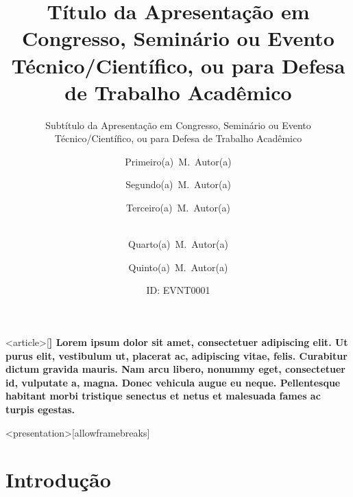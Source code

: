 \documentclass[%
  aspectratio = 169,%
  10pt,%
  t,%
  onlytextwidth,%
  compress,%
  handout,%
  xcolor = table,%
  english,%
  brazilian,%
]{beamer}
\title[Título da Apresentação em\ldots]{%
  Título da Apresentação em Congresso, Seminário ou Evento\\%
  Técnico/Científico, ou para Defesa de Trabalho Acadêmico%
}
\subtitle{%
  Subtítulo da Apresentação em Congresso, Seminário ou Evento\\%
  Técnico/Científico, ou para Defesa de Trabalho Acadêmico%
}
\author[P. M. Autor{(a)} \textit{et al.}]{%
  Primeiro{(a)}~M.~Autor{(a)}%
  \AuthorInfo{%
    Email  = {author1@domain},%
    Lattes = {0000000000000001},%
    ORCID  = {0000-0000-0000-0001},%
    Role   = {Bolsista CAPES},%
    Affil  = {DEP / UTFPR},%
    Inst   = {1},%
  }%
  \Inst{\faTalking}%
  \and Segundo{(a)}~M.~Autor{(a)}%
  \AuthorInfo{%
    Email  = {author2@domain},%
    Lattes = {0000000000000002},%
    ORCID  = {0000-0000-0000-0002},%
    Role   = {Bolsista CNPq},%
    Affil  = {DEP / INST-PARC},%
    Inst   = {2},%
  }%
  \and Terceiro{(a)}~M.~Autor{(a)}%
  \AuthorInfo{%
    Email  = {author3@domain},%
    Lattes = {0000000000000003},%
    ORCID  = {0000-0000-0000-0003},%
    Role   = {Discente},%
    Affil  = {DEP / UTFPR},%
    Inst   = {1},%
  }%
  \and\\ Quarto{(a)}~M.~Autor{(a)}%
  \AuthorInfo{%
    Email  = {author4@domain},%
    Lattes = {0000000000000004},%
    ORCID  = {0000-0000-0000-0004},%
    Role   = {Docente},%
    Affil  = {DEP / INST-PARC},%
    Inst   = {2},%
  }%
  \and Quinto{(a)}~M.~Autor{(a)}%
  \AuthorInfo{%
    Email  = {author5@domain},%
    Lattes = {0000000000000005},%
    ORCID  = {0000-0000-0000-0005},%
    Role   = {Docente},%
    Affil  = {DEP / UTFPR},%
    Inst   = {1},%
  }%
}
\institute[UTFPR {\&} INST-PARC]{%
  \Affil[1]{\UTFPRName, Cidade, Paraná, Brasil}%
  \and\Affil[2]{Instituição Parceira, Cidade, Estado, País}%
  \and\InfoList[\tiny]{\faEnvelope}{\MakeInfoList{Email}}%
  \and\InfoList[\tiny]{\faLattes}{\MakeInfoList{Lattes}}%
  \and\InfoList[\tiny]{\faOrcid}{\MakeInfoList{ORCID}}%
}
\date[ID\@: EVNT\YearNum{-}0001]{ID\@: EVNT\YearNum{-}0001}
\begin{document}
\TitlePage%

\begin{Abstract}<article>[\bfseries]%
Lorem ipsum dolor sit amet, consectetuer adipiscing elit. Ut purus elit, vestibulum ut, placerat ac, adipiscing vitae, felis. Curabitur dictum gravida mauris. Nam arcu libero, nonummy eget, consectetuer id, vulputate a, magna. Donec vehicula augue eu neque. Pellentesque habitant morbi tristique senectus et netus et malesuada fames ac turpis egestas.
\end{Abstract}

\begin{frame}<presentation>[allowframebreaks]%
\frametitle<presentation>{\contentsname}
\tableofcontents[hideallsubsections]
\end{frame}

\section{Introdução}%
\label{sect:intro}
\end{document}
